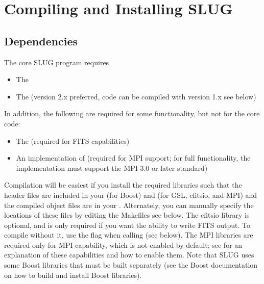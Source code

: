 \documentclass[letterpaper,10pt,english]{sphinxmanual}
\begin{document}
\chapter{Compiling and Installing SLUG}
\label{\detokenize{compiling::doc}}\label{\detokenize{compiling:compiling-and-installing-slug}}

\section{Dependencies}
\label{\detokenize{compiling:dependencies}}
The core SLUG program requires
\begin{itemize}
\item {} 
The 

\item {} 
The  (version 2.x preferred, code can be compiled with version 1.x \textendash{} see below)

\end{itemize}

In addition, the following are required for some functionality, but not for the core code:
\begin{itemize}
\item {} 
The  (required for FITS capabilities)

\item {} 
An implementation of  (required for MPI support; for full functionality, the implementation must support the MPI 3.0 or later standard)

\end{itemize}

Compilation will be easiest if you install the required libraries such that the header files are included in your  (for Boost) and  (for GSL, cfitsio, and MPI) and the compiled object files are in your . Alternately, you can manually specify the locations of these files by editing the Makefiles \textendash{} see below. The cfitsio library is optional, and is only required if you want the ability to write FITS output. To compile without it, use the flag  when calling  (see below). The MPI libraries are required only for MPI capability, which is not enabled by default; see {\hyperref[\detokenize{library:ssec-mpi-support}]{}} for an explanation of these capabilities and how to enable them. Note that SLUG uses some Boost libraries that must be built separately (see the Boost documentation on how to build and install Boost libraries).
\end{document}
